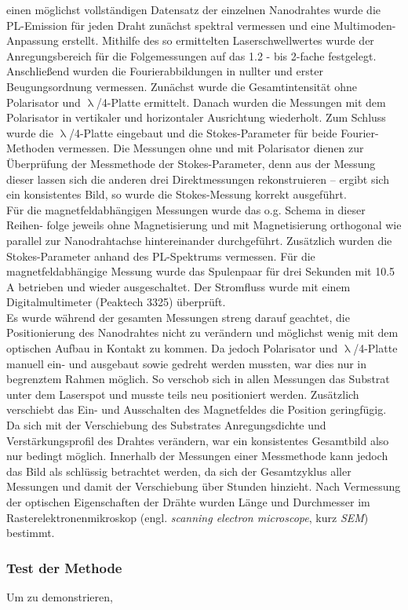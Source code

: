 einen möglichst vollständigen Datensatz der einzelnen Nanodrahtes wurde die
PL-Emission für jeden Draht zunächst spektral vermessen und eine
Multimoden-Anpassung erstellt. Mithilfe des so ermittelten Laserschwellwertes
wurde der Anregungsbereich für die Folgemessungen auf das 1.2 - bis 2-fache
festgelegt. Anschließend wurden die Fourierabbildungen in nullter und erster
Beugungsordnung vermessen. Zunächst wurde die Gesamtintensität ohne Polarisator
und $\uplambda$/4-Platte ermittelt. Danach wurden die Messungen mit dem
Polarisator in vertikaler und horizontaler Ausrichtung wiederholt. Zum Schluss
wurde die $\uplambda$/4-Platte eingebaut und die Stokes-Parameter für beide
Fourier-Methoden vermessen. Die Messungen ohne und mit Polarisator dienen zur
Überprüfung der Messmethode der Stokes-Parameter, denn aus der Messung dieser
lassen sich die anderen drei Direktmessungen rekonstruieren – ergibt sich ein
konsistentes Bild, so wurde die Stokes-Messung korrekt ausgeführt. \\ Für die
magnetfeldabhängigen Messungen wurde das o.g. Schema in dieser Reihen- folge
jeweils ohne Magnetisierung und mit Magnetisierung orthogonal wie parallel zur
Nanodrahtachse hintereinander durchgeführt. Zusätzlich wurden die
Stokes-Parameter anhand des PL-Spektrums vermessen. Für die magnetfeldabhängige
Messung wurde das Spulenpaar für drei Sekunden mit 10.5 A betrieben und wieder
ausgeschaltet. Der Stromfluss wurde mit einem Digitalmultimeter (Peaktech 3325)
überprüft. \\ Es wurde während der gesamten Messungen streng darauf geachtet,
die Positionierung des Nanodrahtes nicht zu verändern und möglichst wenig mit
dem optischen Aufbau in Kontakt zu kommen. Da jedoch Polarisator und
$\uplambda$/4-Platte manuell ein- und ausgebaut sowie gedreht werden mussten,
war dies nur in begrenztem Rahmen möglich. So verschob sich in allen Messungen
das Substrat unter dem Laserspot und musste teils neu positioniert werden.
Zusätzlich verschiebt das Ein- und Ausschalten des Magnetfeldes die Position
geringfügig. Da sich mit der Verschiebung des Substrates Anregungsdichte und
Verstärkungsprofil des Drahtes verändern, war ein konsistentes Gesamtbild also
nur bedingt möglich. Innerhalb der Messungen einer Messmethode kann jedoch das
Bild als schlüssig betrachtet werden, da sich der Gesamtzyklus aller Messungen
und damit der Verschiebung über Stunden hinzieht. Nach Vermessung der optischen
Eigenschaften der Drähte wurden Länge und Durchmesser im
Rasterelektronenmikroskop (engl. \textit{scanning electron microscope}, kurz
\textit{SEM}) bestimmt. \subsubsection{Test der Methode} Um zu demonstrieren,
